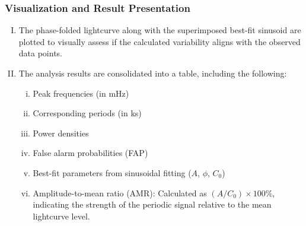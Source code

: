     		\subsubsection{Visualization and Result Presentation}
    			\begin{enumerate}[I.]
    				\item The phase-folded lightcurve along with the superimposed best-fit sinusoid are plotted to visually assess if the calculated variability aligns with the observed data points.
    				\item The analysis results are consolidated into a table, including the following:
    				\begin{enumerate}[i.]
    					\item Peak frequencies (in mHz)
    					\item Corresponding periods (in ks)
    					\item Power densities
    					\item False alarm probabilities (FAP)
    					\item Best-fit parameters from sinusoidal fitting ($A$, $\phi$, $C_0$)
    					\item Amplitude-to-mean ratio (AMR): Calculated as $(A/C_0)\times 100\%$, indicating the strength of the periodic signal relative to the mean lightcurve level.
    				\end{enumerate}
    			\end{enumerate}